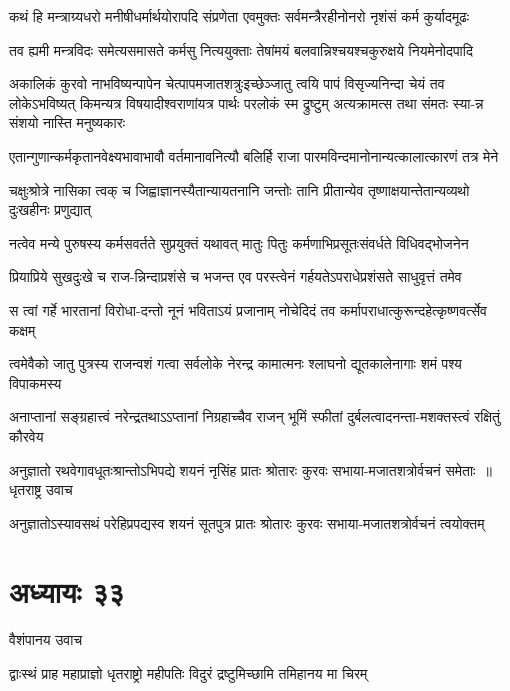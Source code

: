 \twolineshloka
{कथं हि मन्त्राग्र्यधरो मनीषीधर्मार्थयोरापदि संप्रणेता}
{एवमुक्तः सर्वमन्त्रैरहीनोनरो नृशंसं कर्म कुर्यादमूढः}


\twolineshloka
{तव ह्यमी मन्त्रविदः समेत्यसमासते कर्मसु नित्ययुक्ताः}
{तेषांमयं बलवान्निश्चयश्चकुरुक्षये नियमेनोदपादि}


अकालिकं कुरवो नाभविष्यन्पापेन चेत्पापमजातशत्रुःइच्छेञ्जातु त्वयि पापं विसृज्यनिन्दा चेयं तव लोकेऽभविष्यत्
\twolineshloka
{किमन्यत्र विषयादीश्वराणांयत्र पार्थः परलोकं स्म द्रुष्टुम्}
{अत्यक्रामत्स तथा संमतः स्या-न्न संशयो नास्ति मनुष्यकारः}


\twolineshloka
{एतान्गुणान्कर्मकृतानवेक्ष्यभावाभावौ वर्तमानावनित्यौ}
{बलिर्हि राजा पारमविन्दमानोनान्यत्कालात्कारणं तत्र मेने}


\twolineshloka
{चक्षुःश्रोत्रे नासिका त्वक् च जिह्वाज्ञानस्यैतान्यायतनानि जन्तोः}
{तानि प्रीतान्येव तृष्णाक्षयान्तेतान्यव्यथो दुःखहीनः प्रणुद्यात्}


\twolineshloka
{नत्वेव मन्ये पुरुषस्य कर्मसवर्तते सुप्रयुक्तं यथावत्}
{मातुः पितुः कर्मणाभिप्रसूतःसंवर्धते विधिवद्भोजनेन}


\twolineshloka
{प्रियाप्रिये सुखदुःखे च राज-न्निन्दाप्रशंसे च भजन्त एव}
{परस्त्वेनं गर्हयतेऽपराधेप्रशंसते साधुवृत्तं तमेव}


\twolineshloka
{स त्वां गर्हे भारतानां विरोधा-दन्तो नूनं भविताऽयं प्रजानाम्}
{नोचेदिदं तव कर्मापराधात्कुरून्दहेत्कृष्णवर्त्सेव कक्षम्}


\twolineshloka
{त्वमेवैको जातु पुत्रस्य राजन्वशं गत्वा सर्वलोके नेरन्द्र}
{कामात्मनः श्लाघनो द्यूतकालेनागाः शमं पश्य विपाकमस्य}


\twolineshloka
{अनाप्तानां सङ्ग्रहात्त्वं नरेन्द्रतथाऽऽप्तानां निग्रहाच्चैव राजन्}
{भूमिं स्फीतां दुर्बलत्वादनन्ता-मशक्तस्त्वं रक्षितुं कौरवेय}


\threelineshloka
{अनुज्ञातो रथवेगावधूतःश्रान्तोऽभिपद्ये शयनं नृसिंह}
{प्रातः श्रोतारः कुरवः सभाया-मजातशत्रोर्वचनं समेताः ॥धृतराष्ट्र उवाच}
{}


\twolineshloka
{अनुज्ञातोऽस्यावसथं परेहिप्रपद्यस्व शयनं सूतपुत्र}
{प्रातः श्रोतारः कुरवः सभाया-मजातशत्रोर्वचनं त्वयोक्तम्}


\chapter{अध्यायः ३३}
\twolineshloka
{वैशंपानय उवाच}
{}


\twolineshloka
{द्वाःस्थं प्राह महाप्राज्ञो धृतराष्ट्रो महीपतिः}
{विदुरं द्रष्टुमिच्छामि तमिहानय मा चिरम्}



